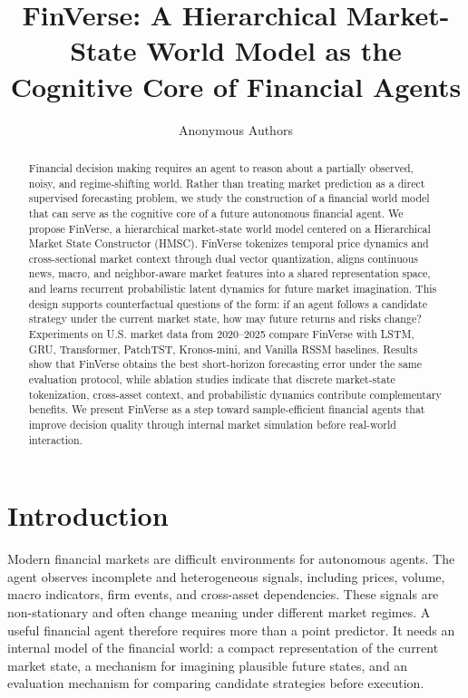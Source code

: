 \documentclass[letterpaper]{article}
\title{FinVerse: A Hierarchical Market-State World Model as the Cognitive Core of Financial Agents}
\author{
Anonymous Authors
}
\affil{
Paper under review
}
\begin{document}
\maketitle

\begin{abstract}
Financial decision making requires an agent to reason about a partially observed, noisy, and regime-shifting world. Rather than treating market prediction as a direct supervised forecasting problem, we study the construction of a financial world model that can serve as the cognitive core of a future autonomous financial agent. We propose FinVerse, a hierarchical market-state world model centered on a Hierarchical Market State Constructor (HMSC). FinVerse tokenizes temporal price dynamics and cross-sectional market context through dual vector quantization, aligns continuous news, macro, and neighbor-aware market features into a shared representation space, and learns recurrent probabilistic latent dynamics for future market imagination. This design supports counterfactual questions of the form: if an agent follows a candidate strategy under the current market state, how may future returns and risks change? Experiments on U.S. market data from 2020--2025 compare FinVerse with LSTM, GRU, Transformer, PatchTST, Kronos-mini, and Vanilla RSSM baselines. Results show that FinVerse obtains the best short-horizon forecasting error under the same evaluation protocol, while ablation studies indicate that discrete market-state tokenization, cross-asset context, and probabilistic dynamics contribute complementary benefits. We present FinVerse as a step toward sample-efficient financial agents that improve decision quality through internal market simulation before real-world interaction.
\end{abstract}

\section{Introduction}
Modern financial markets are difficult environments for autonomous agents. The agent observes incomplete and heterogeneous signals, including prices, volume, macro indicators, firm events, and cross-asset dependencies. These signals are non-stationary and often change meaning under different market regimes. A useful financial agent therefore requires more than a point predictor. It needs an internal model of the financial world: a compact representation of the current market state, a mechanism for imagining plausible future states, and an evaluation mechanism for comparing candidate strategies before execution.
\end{document}

